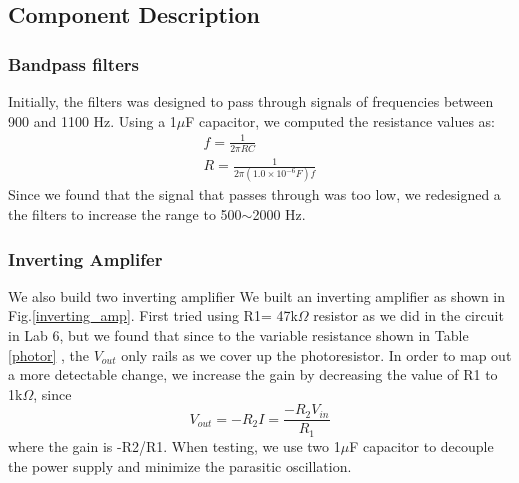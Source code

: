 \documentclass[authoryear, 12pt,5p, times]{elsarticle}
\begin{document}
\subsection{Component Description}
\subsubsection{Bandpass filters}
Initially, the filters was designed to pass through signals of frequencies between 900 and 1100 Hz. Using a 1$\mu$F capacitor, we computed the resistance values as: 
\begin{align*}
f = \frac{1}{2\pi RC}
\\ R = \frac{1}{2\pi (1.0\times10^{-6} F)f}
\end{align*}
Since we found that the signal that passes through was too low, we redesigned a the filters to increase the range to 500$\sim$2000 Hz.
\subsubsection{Inverting Amplifer}
\par We also build two inverting amplifier 
We built an inverting amplifier as shown in Fig.\ref{inverting_amp}. First tried using R1= 47k$\Omega$ resistor as we did in the circuit in Lab 6, but we found that since to the variable resistance shown in Table \ref{photor} , the $V_{out}$ only rails as we cover up the photoresistor. In order to map out a more detectable change, we increase the gain by decreasing the value of R1 to 1k$\Omega$, since
\begin{equation}
V_{out} = -R_2I = \frac{-R_2V_{in}}{R_1}
\end{equation}
where the gain is -R2/R1. When testing, we use two 1$\mu$F capacitor to decouple the power supply and minimize the parasitic oscillation. 
\end{document}
